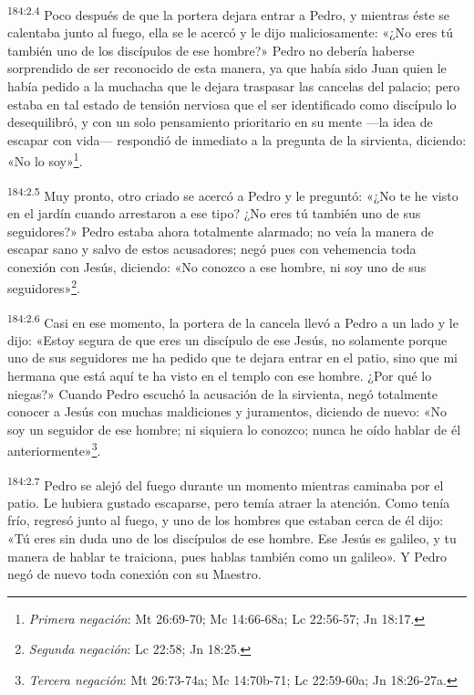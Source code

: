 \par
\textsuperscript{184:2.4} Poco después de que la portera dejara entrar a Pedro, y mientras éste se calentaba junto al fuego, ella se le acercó y le dijo maliciosamente: «¿No eres tú también uno de los discípulos de ese hombre?» Pedro no debería haberse sorprendido de ser reconocido de esta manera, ya que había sido Juan quien le había pedido a la muchacha que le dejara traspasar las cancelas del palacio; pero estaba en tal estado de tensión nerviosa que el ser identificado como discípulo lo desequilibró, y con un solo pensamiento prioritario en su mente ---la idea de escapar con vida--- respondió de inmediato a la pregunta de la sirvienta, diciendo: «No lo soy»\footnote{\textit{Primera negación}: Mt 26:69-70; Mc 14:66-68a; Lc 22:56-57; Jn 18:17.}.

\par
\textsuperscript{184:2.5} Muy pronto, otro criado se acercó a Pedro y le preguntó: «¿No te he visto en el jardín cuando arrestaron a ese tipo? ¿No eres tú también uno de sus seguidores?» Pedro estaba ahora totalmente alarmado; no veía la manera de escapar sano y salvo de estos acusadores; negó pues con vehemencia toda conexión con Jesús, diciendo: «No conozco a ese hombre, ni soy uno de sus seguidores»\footnote{\textit{Segunda negación}: Lc 22:58; Jn 18:25.}.

\par
\textsuperscript{184:2.6} Casi en ese momento, la portera de la cancela llevó a Pedro a un lado y le dijo: «Estoy segura de que eres un discípulo de ese Jesús, no solamente porque uno de sus seguidores me ha pedido que te dejara entrar en el patio, sino que mi hermana que está aquí te ha visto en el templo con ese hombre. ¿Por qué lo niegas?» Cuando Pedro escuchó la acusación de la sirvienta, negó totalmente conocer a Jesús con muchas maldiciones y juramentos, diciendo de nuevo: «No soy un seguidor de ese hombre; ni siquiera lo conozco; nunca he oído hablar de él anteriormente»\footnote{\textit{Tercera negación}: Mt 26:73-74a; Mc 14:70b-71; Lc 22:59-60a; Jn 18:26-27a.}.

\par
\textsuperscript{184:2.7} Pedro se alejó del fuego durante un momento mientras caminaba por el patio. Le hubiera gustado escaparse, pero temía atraer la atención. Como tenía frío, regresó junto al fuego, y uno de los hombres que estaban cerca de él dijo: «Tú eres sin duda uno de los discípulos de ese hombre. Ese Jesús es galileo, y tu manera de hablar te traiciona, pues hablas también como un galileo». Y Pedro negó de nuevo toda conexión con su Maestro.

